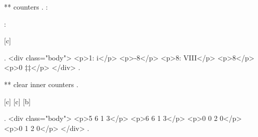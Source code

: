 ** counters
.
\thec: 

\addtocounter{c}{3 * -(2+1)}    %

\thec: 

\the\value{c}

[c]
\setcounter{a}{\value{c}}

.
<div class="body">
<p>1: i</p>
<p>-8</p>
<p>8: VIII</p>
<p>8</p>
<p>0 ‡‡</p>
</div>
.


** clear inner counters
.

[c]	%
[c]
[b]

\setcounter{a}{5}
\setcounter{b}{6}
\setcounter{d}{3}




.
<div class="body">
<p>5 6 1 3</p>
<p>6 6 1 3</p>
<p>0 0 2 0</p>
<p>0 1 2 0</p>
</div>
.